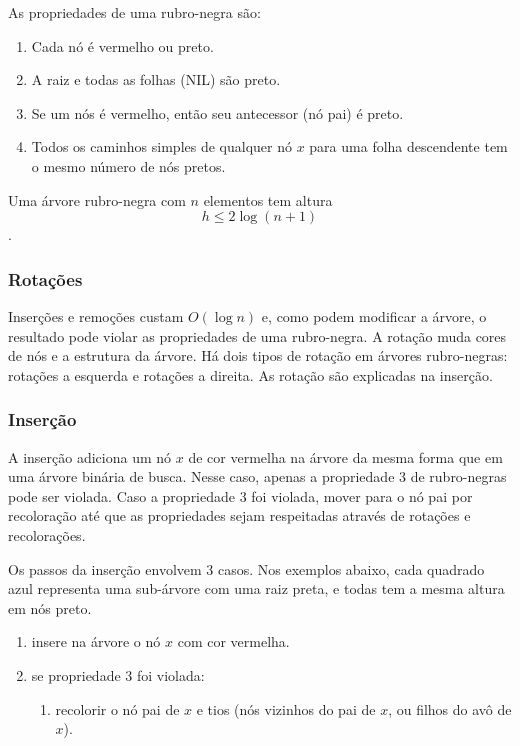 As propriedades de uma rubro-negra são:
\begin{enumerate}
\item Cada nó é vermelho ou preto.
\item A raiz e todas as folhas (\textsc{NIL}) são preto.
\item Se um nós é vermelho, então seu antecessor (nó pai) é preto.
\item Todos os caminhos simples de qualquer nó $x$ para uma folha descendente 
tem o mesmo número de nós pretos.
\end{enumerate}

\begin{theorem}
Uma árvore rubro-negra com $n$ elementos tem altura
\[ h \leq 2 \log (n + 1) \].
\end{theorem}

\subsubsection{Rotações}

Inserções e remoções custam $O(\log n)$ e, como podem modificar a árvore,
o resultado pode violar as propriedades de uma rubro-negra.
A rotação muda cores de nós e a estrutura da árvore.
Há dois tipos de rotação em árvores rubro-negras: rotações a esquerda e 
rotações a direita.
As rotação são explicadas na inserção.

\subsubsection{Inserção}

A inserção adiciona um nó $x$ de cor vermelha na árvore da mesma forma que 
em uma árvore binária de busca.
Nesse caso, apenas a propriedade 3 de rubro-negras pode ser violada.
Caso a propriedade 3 foi violada, mover para o nó pai por recoloração até que
as propriedades sejam respeitadas através de rotações e recolorações.

Os passos da inserção envolvem 3 casos. Nos exemplos abaixo,
cada quadrado azul representa uma sub-árvore com uma raiz preta, e todas
tem a mesma altura em nós preto.
\begin{enumerate}
\item insere na árvore o nó $x$ com cor vermelha.
\item se propriedade 3 foi violada:
	\begin{enumerate}
	\item recolorir o nó pai de $x$ e tios (nós vizinhos do pai de $x$, ou filhos do avô de $x$).
	\end{enumerate}
\end{enumerate}

